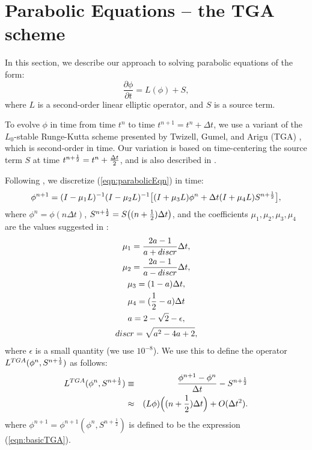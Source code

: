 \section{Parabolic Equations -- the TGA scheme \label{section:TGA}}
In this section, we describe our approach to solving parabolic
equations of the form:
\begin{equation}
\frac{\partial \phi}{\partial t} = L(\phi) + S,
\label{eqn:parabolicEqn}
\end{equation}
where $L$ is a second-order linear elliptic operator, and  $S$ is a
source term. 

To evolve $\phi$ in time from time $t^n$ to time $t^{n+1} = t^n +
\Delta t$, we use a variant of the $L_0$-stable Runge-Kutta scheme
presented by Twizell, Gumel, and Arigu (TGA) \cite{TGA}, which is
second-order in time.  Our variation is based on time-centering the 
source term $S$ at time $t^{n+\frac{1}{2}} = t^n + \frac{\Delta t}{2}$, and
is also described in \cite{martinColellaGraves:2008}. 

Following \cite{TGA}, we discretize (\ref{eqn:parabolicEqn}) in time:
\begin{equation}
\phi^{n+1} = (I-\mu_1L)^{-1}(I-\mu_2L)^{-1}\bigl[(I+\mu_3L)\phi^n + \Delta t
  (I +  \mu_4L)S^{n+\frac{1}{2}}\bigr],
\label{eqn:basicTGA}
\end{equation}
where $\phi^n = \phi(n \Delta t)$, $S^{n+\frac{1}{2}} = S\bigl( (n+\frac{1}{2})\Delta
t\bigr)$, and the coefficients $\mu_1, \mu_2, \mu_3, \mu_4$ are the
values suggested in \cite{TGA}: 
\begin{gather}
\mu_1   =   \frac{2a - 1}{a + discr}\Delta t, \nonumber \\
\mu_2   =   \frac{2a - 1}{a - discr}\Delta t, \nonumber \\
\mu_3   =   (1-a)\Delta t, \nonumber \\
\mu_4   =   (\frac{1}{2} - a)\Delta t \nonumber \\
a   =   2 - \sqrt{2} - \epsilon, \nonumber \\
discr   =   \sqrt{a^2 - 4a + 2}, \nonumber 
\end{gather}
where $\epsilon$ is a small quantity (we use $10^{-8}$).  We use this 
to define the operator $L^{TGA}(\phi^n,S^{n+\frac{1}{2}})$ as follows: 
\begin{eqnarray}
L^{TGA}(\phi^n, S^{n+\frac{1}{2}}) & \equiv & \frac{\phi^{n+1} - \phi^n}{\Delta t} -
S^{n+\frac{1}{2}} \label{eqn:defLTGA} \\
& \approx & (L\phi)\Bigl( (n+\frac{1}{2})\Delta t\Bigr) + O(\Delta t^2). \nonumber
\end{eqnarray}
where $\phi^{n+1} = \phi^{n+1}(\phi^n,S^{n + \frac{1}{2}})$ is defined to be
the expression (\ref{eqn:basicTGA}). 

